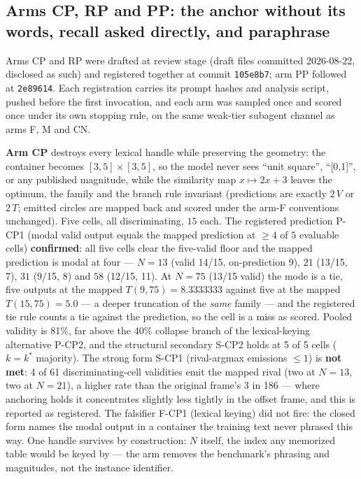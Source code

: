 \subsection{Arms CP, RP and PP: the anchor without its words, recall asked directly, and paraphrase}

Arms CP and RP were drafted at review stage (draft files committed 2026-08-22, disclosed
as such) and registered together at commit \texttt{105e8b7}; arm PP followed at
\texttt{2e89614}. Each registration carries its prompt hashes and analysis script,
pushed before the first invocation, and each arm was sampled once and scored once under
its own stopping rule, on the same weak-tier subagent channel as arms F, M and CN.

\textbf{Arm CP} destroys every lexical handle while preserving the geometry: the container
becomes $[3,5] \times [3,5]$, so the model never sees ``unit square'', ``[0,1]'', or any
published magnitude, while the similarity map $x \mapsto 2x + 3$ leaves the optimum, the
family and the branch rule invariant (predictions are exactly $2\,V$ or $2\,T$; emitted
circles are mapped back and scored under the arm-F conventions unchanged). Five cells,
all discriminating, $15$ each. The registered prediction P-CP1 (modal valid output equals
the mapped prediction at $\ge 4$ of $5$ evaluable cells) \textbf{confirmed}: all five
cells clear the five-valid floor and the mapped prediction is modal at four ---
$N = 13$ (valid 14/15, on-prediction 9), $21$ (13/15, 7), $31$ (9/15, 8) and $58$
(12/15, 11). At $N = 75$ (13/15 valid) the mode is a tie, five outputs at the mapped
$T(9,75) = 8.3333333$ against five at the mapped $T(15,75) = 5.0$ --- a deeper truncation
of the \emph{same} family --- and the registered tie rule counts a tie against the
prediction, so the cell is a miss as scored. Pooled validity is 81\%, far above the 40\%
collapse branch of the lexical-keying alternative P-CP2, and the structural secondary
S-CP2 holds at 5 of 5 cells ($k = k^*$ majority). The strong form S-CP1 (rival-argmax
emissions $\le 1$) is \textbf{not met}: 4 of 61 discriminating-cell validities emit the
mapped rival (two at $N = 13$, two at $N = 21$), a higher rate than the original frame's
3 in 186 --- where anchoring holds it concentrates slightly less tightly in the offset
frame, and this is reported as registered. The falsifier F-CP1 (lexical keying) did not
fire: the closed form names the modal output in a container the training text never
phrased this way. One handle survives by construction: $N$ itself, the index any memorized
table would be keyed by --- the arm removes the benchmark's phrasing and magnitudes, not
the instance identifier.

